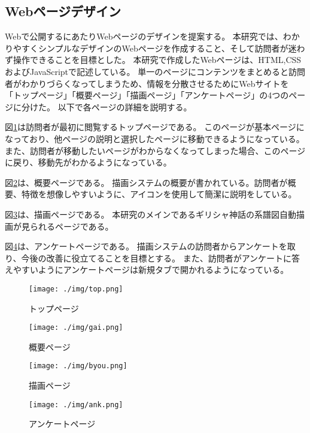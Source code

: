 \subsection{Webページデザイン}
\label{tag:web}
Webで公開するにあたりWebページのデザインを提案する。
本研究では、わかりやすくシンプルなデザインのWebページを作成すること、そして訪問者が迷わず操作できることを目標とした。
本研究で作成したWebページは、HTML,CSSおよびJavaScriptで記述している。
単一のページにコンテンツをまとめると訪問者がわかりづらくなってしまうため、情報を分散させるためにWebサイトを
「トップページ」「概要ページ」「描画ページ」「アンケートページ」の4つのページに分けた。
以下で各ページの詳細を説明する。

図\ref{fig:top}は訪問者が最初に閲覧するトップページである。
このページが基本ページになっており、他ページの説明と選択したページに移動できるようになっている。
また、訪問者が移動したいページがわからなくなってしまった場合、このページに戻り、移動先がわかるようになっている。

図\ref{fig:gai}は、概要ページである。
描画システムの概要が書かれている。訪問者が概要、特徴を想像しやすいように、アイコンを使用して簡潔に説明をしている。

図\ref{fig:byou}は、描画ページである。
本研究のメインであるギリシャ神話の系譜図自動描画が見られるページである。

図\ref{fig:ank}は、アンケートページである。
描画システムの訪問者からアンケートを取り、今後の改善に役立てることを目標とする。
また、訪問者がアンケートに答えやすいようにアンケートページは新規タブで開かれるようになっている。

\begin{figure}[htbp]
  \begin{center}
    \texttt{[image: ./img/top.png]}
    \caption{トップページ}
    \label{fig:top}
  \end{center}
\end{figure}

\begin{figure}[htbp]
  \begin{center}
    \texttt{[image: ./img/gai.png]}
    \caption{概要ページ}
    \label{fig:gai}
  \end{center}
\end{figure}

\begin{figure}[htbp]
  \begin{center}
    \texttt{[image: ./img/byou.png]}
    \caption{描画ページ}
    \label{fig:byou}
  \end{center}
\end{figure}

\begin{figure}[htbp]
  \begin{center}
    \texttt{[image: ./img/ank.png]}
    \caption{アンケートページ}
    \label{fig:ank}
  \end{center}
\end{figure}